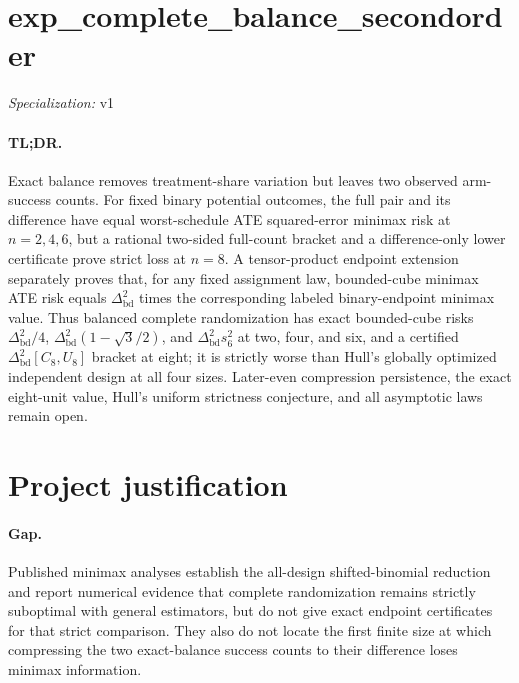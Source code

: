 \documentclass{article}
\begin{document}
\sloppy

\section*{exp\_\allowbreak{}complete\_\allowbreak{}balance\_\allowbreak{}secondorder}

\noindent\textit{Specialization:} v1\par

\paragraph{TL;DR.} Exact balance removes treatment-share variation but leaves two observed arm-success counts. For fixed binary potential outcomes, the full pair and its difference have equal worst-schedule ATE squared-error minimax risk at \(n=2,4,6\), but a rational two-sided full-count bracket and a difference-only lower certificate prove strict loss at \(n=8\). A tensor-product endpoint extension separately proves that, for any fixed assignment law, bounded-cube minimax ATE risk equals \(\Delta_{\mathrm{bd}}^2\) times the corresponding labeled binary-endpoint minimax value. Thus balanced complete randomization has exact bounded-cube risks \(\Delta_{\mathrm{bd}}^2/4\), \(\Delta_{\mathrm{bd}}^2(1-\sqrt3/2)\), and \(\Delta_{\mathrm{bd}}^2s_6^2\) at two, four, and six, and a certified \(\Delta_{\mathrm{bd}}^2[C_8,U_8]\) bracket at eight; it is strictly worse than Hull's globally optimized independent design at all four sizes. Later-even compression persistence, the exact eight-unit value, Hull's uniform strictness conjecture, and all asymptotic laws remain open.

\section{Project justification}

\paragraph{Gap.} Published minimax analyses establish the all-design shifted-binomial reduction and report numerical evidence that complete randomization remains strictly suboptimal with general estimators, but do not give exact endpoint certificates for that strict comparison. They also do not locate the first finite size at which compressing the two exact-balance success counts to their difference loses minimax information.
\end{document}
